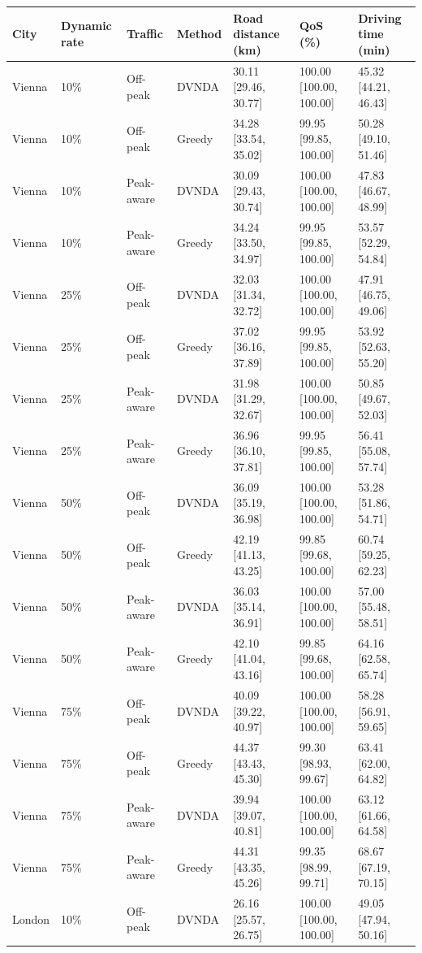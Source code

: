 \begin{tabular}{lllllll}
\hline
City & Dynamic rate & Traffic & Method & Road distance (km) & QoS (\%) & Driving time (min) \\
\hline
Vienna & 10\% & Off-peak & DVNDA & 30.11 [29.46, 30.77] & 100.00 [100.00, 100.00] & 45.32 [44.21, 46.43] \\
Vienna & 10\% & Off-peak & Greedy & 34.28 [33.54, 35.02] & 99.95 [99.85, 100.00] & 50.28 [49.10, 51.46] \\
Vienna & 10\% & Peak-aware & DVNDA & 30.09 [29.43, 30.74] & 100.00 [100.00, 100.00] & 47.83 [46.67, 48.99] \\
Vienna & 10\% & Peak-aware & Greedy & 34.24 [33.50, 34.97] & 99.95 [99.85, 100.00] & 53.57 [52.29, 54.84] \\
Vienna & 25\% & Off-peak & DVNDA & 32.03 [31.34, 32.72] & 100.00 [100.00, 100.00] & 47.91 [46.75, 49.06] \\
Vienna & 25\% & Off-peak & Greedy & 37.02 [36.16, 37.89] & 99.95 [99.85, 100.00] & 53.92 [52.63, 55.20] \\
Vienna & 25\% & Peak-aware & DVNDA & 31.98 [31.29, 32.67] & 100.00 [100.00, 100.00] & 50.85 [49.67, 52.03] \\
Vienna & 25\% & Peak-aware & Greedy & 36.96 [36.10, 37.81] & 99.95 [99.85, 100.00] & 56.41 [55.08, 57.74] \\
Vienna & 50\% & Off-peak & DVNDA & 36.09 [35.19, 36.98] & 100.00 [100.00, 100.00] & 53.28 [51.86, 54.71] \\
Vienna & 50\% & Off-peak & Greedy & 42.19 [41.13, 43.25] & 99.85 [99.68, 100.00] & 60.74 [59.25, 62.23] \\
Vienna & 50\% & Peak-aware & DVNDA & 36.03 [35.14, 36.91] & 100.00 [100.00, 100.00] & 57.00 [55.48, 58.51] \\
Vienna & 50\% & Peak-aware & Greedy & 42.10 [41.04, 43.16] & 99.85 [99.68, 100.00] & 64.16 [62.58, 65.74] \\
Vienna & 75\% & Off-peak & DVNDA & 40.09 [39.22, 40.97] & 100.00 [100.00, 100.00] & 58.28 [56.91, 59.65] \\
Vienna & 75\% & Off-peak & Greedy & 44.37 [43.43, 45.30] & 99.30 [98.93, 99.67] & 63.41 [62.00, 64.82] \\
Vienna & 75\% & Peak-aware & DVNDA & 39.94 [39.07, 40.81] & 100.00 [100.00, 100.00] & 63.12 [61.66, 64.58] \\
Vienna & 75\% & Peak-aware & Greedy & 44.31 [43.35, 45.26] & 99.35 [98.99, 99.71] & 68.67 [67.19, 70.15] \\
London & 10\% & Off-peak & DVNDA & 26.16 [25.57, 26.75] & 100.00 [100.00, 100.00] & 49.05 [47.94, 50.16] \\

\end{tabular}
